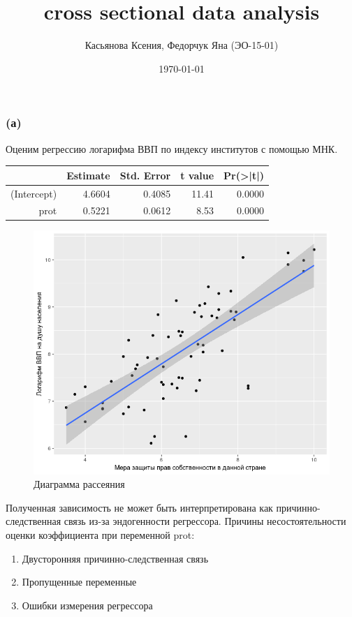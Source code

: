 \documentclass[a4paper,12pt]{article} %
\author{Касьянова Ксения, Федорчук Яна (ЭО-15-01) }
\title{cross sectional data analysis}
\date{\today}
\begin{document}
\maketitle

\subsubsection*{(а)}	
	
Оценим регрессию логарифма ВВП по индексу институтов с помощью МНК.
	
	
\begin{table}[h!]
	\centering
	\begin{tabular}{rrrrr}
		\hline
		& Estimate & Std. Error & t value & Pr(>|t|) \\ 
		\hline
		(Intercept) & 4.6604 & 0.4085 & 11.41 & 0.0000 \\ 
		prot & 0.5221 & 0.0612 & 8.53 & 0.0000 \\ 
		\hline
	\end{tabular}
\end{table}	
	
\begin{figure}[h!]
	\centering
	\includegraphics[width=0.7\linewidth]{Rplot1}
	\caption[Диаграмма рассеяния]{Диаграмма рассеяния}
	\label{fig:rplot1}
\end{figure}



Полученная зависимость не может быть интерпретирована как
причинно-следственная связь из-за  эндогенности  регрессора. 
Причины несостоятельности оценки коэффициента при переменной prot:
\begin{enumerate}
	\item Двусторонняя причинно-следственная связь
\item Пропущенные переменные
\item Ошибки измерения регрессора
\end{enumerate}	
	
\end{document}
